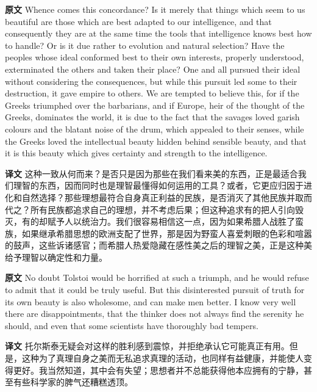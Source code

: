 \documentclass[UTF8]{ctexart}
\newenvironment{english}{\par\small\noindent\textbf{原文}\quad\ignorespaces}{\par}
\newenvironment{zhtranslation}{\par\noindent\textbf{译文}\quad\ignorespaces}{\par\vspace{0.35em}}
\begin{document}
\begin{english}
Whence comes this concordance? Is it merely that things which seem to us beautiful are those which are best adapted to our intelligence, and that consequently they are at the same time the tools that intelligence knows best how to handle? Or is it due rather to evolution and natural selection? Have the peoples whose ideal conformed best to their own interests, properly understood, exterminated the others and taken their place? One and all pursued their ideal without considering the consequences, but while this pursuit led some to their destruction, it gave empire to others. We are tempted to believe this, for if the Greeks triumphed over the barbarians, and if Europe, heir of the thought of the Greeks, dominates the world, it is due to the fact that the savages loved garish colours and the blatant noise of the drum, which appealed to their senses, while the Greeks loved the intellectual beauty hidden behind sensible beauty, and that it is this beauty which gives certainty and strength to the intelligence.
\end{english}
\begin{zhtranslation}
这种一致从何而来？是否只是因为那些在我们看来美的东西，正是最适合我们理智的东西，因而同时也是理智最懂得如何运用的工具？或者，它更应归因于进化和自然选择？那些理想最符合自身真正利益的民族，是否消灭了其他民族并取而代之？所有民族都追求自己的理想，并不考虑后果；但这种追求有的把人引向毁灭，有的却赋予人以统治力。我们很容易相信这一点，因为如果希腊人战胜了蛮族，如果继承希腊思想的欧洲支配了世界，那是因为野蛮人喜爱刺眼的色彩和喧嚣的鼓声，这些诉诸感官；而希腊人热爱隐藏在感性美之后的理智之美，正是这种美给予理智以确定性和力量。\end{zhtranslation}

\begin{english}
No doubt Tolstoi would be horrified at such a triumph, and he would refuse to admit that it could be truly useful. But this disinterested pursuit of truth for its own beauty is also wholesome, and can make men better. I know very well there are disappointments, that the thinker does not always find the serenity he should, and even that some scientists have thoroughly bad tempers.
\end{english}
\begin{zhtranslation}
托尔斯泰无疑会对这样的胜利感到震惊，并拒绝承认它可能真正有用。但是，这种为了真理自身之美而无私追求真理的活动，也同样有益健康，并能使人变得更好。我当然知道，其中会有失望；思想者并不总能获得他本应拥有的宁静，甚至有些科学家的脾气还糟糕透顶。\end{zhtranslation}
\end{document}
